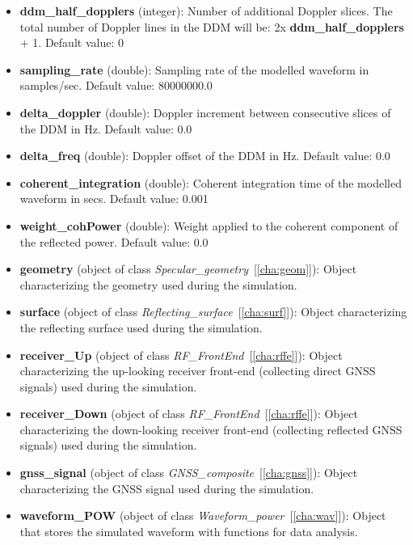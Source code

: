 \begin{itemize}
\item {\bf ddm\_half\_dopplers} (integer): Number of additional Doppler slices. The total number of Doppler lines in the DDM will be: 2x {\bf ddm\_half\_dopplers} + 1. Default value: 0

\item {\bf sampling\_rate} (double): Sampling rate of the modelled waveform in samples/sec. Default value: 80000000.0

\item {\bf delta\_doppler} (double): Doppler increment between consecutive slices of the DDM in Hz. Default value: 0.0

\item {\bf delta\_freq} (double): Doppler offset of the DDM in Hz. Default value: 0.0

\item {\bf coherent\_integration} (double): Coherent integration time of the modelled waveform in secs. Default value: 0.001

\item {\bf weight\_cohPower} (double): Weight applied to the coherent component of the reflected power. Default value: 0.0

\item {\bf geometry} (object of class {\it Specular\_geometry}~[\ref{cha:geom}]): Object characterizing the geometry used during the simulation.

\item {\bf surface} (object of class {\it Reflecting\_surface}~[\ref{cha:surf}]): Object characterizing the reflecting surface used during the simulation.

\item {\bf receiver\_Up} (object of class {\it RF\_FrontEnd}~[\ref{cha:rffe}]): Object characterizing the up-looking receiver front-end (collecting direct GNSS signals) used during the simulation.

\item {\bf receiver\_Down} (object of class {\it RF\_FrontEnd}~[\ref{cha:rffe}]): Object characterizing the down-looking receiver front-end (collecting reflected GNSS signals) used during the simulation.

\item {\bf gnss\_signal} (object of class {\it GNSS\_composite}~[\ref{cha:gnss}]): Object characterizing the GNSS signal used during the simulation.

\item {\bf waveform\_POW} (object of class {\it Waveform\_power}~[\ref{cha:wav}]): Object that stores the simulated waveform with functions for data analysis.
\end{itemize}

